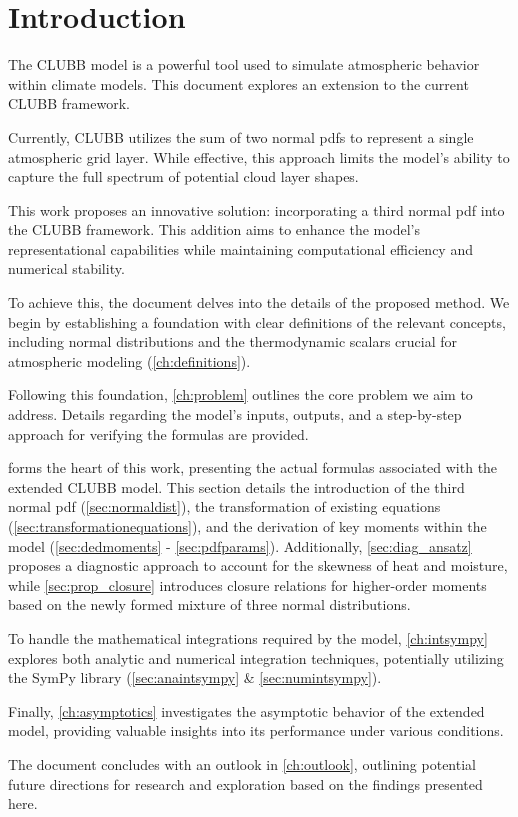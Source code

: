\chapter{Introduction}\label{ch:introduction}

The \gls{CLUBB} model is a powerful tool used to simulate atmospheric behavior within climate models.
This document explores an extension to the current \gls{CLUBB} framework.

Currently, \gls{CLUBB} utilizes the sum of two normal \glspl{pdf} to represent a single atmospheric grid layer.
While effective, this approach limits the model's ability to capture the full spectrum of potential cloud layer shapes.

This work proposes an innovative solution: incorporating a third normal \gls{pdf} into the \gls{CLUBB} framework.
This addition aims to enhance the model's representational capabilities while maintaining computational efficiency and numerical stability.

To achieve this, the document delves into the details of the proposed method.
We begin by establishing a foundation with clear definitions of the relevant concepts, including normal distributions and the thermodynamic scalars crucial for atmospheric modeling (\cref{ch:definitions}).

Following this foundation, \cref{ch:problem} outlines the core problem we aim to address.
Details regarding the model's inputs, outputs, and a step-by-step approach for verifying the formulas are provided.

 forms the heart of this work, presenting the actual formulas associated with the extended CLUBB model.
This section details the introduction of the third normal \gls{pdf} (\cref{sec:normaldist}), the transformation of existing equations (\cref{sec:transformationequations}), and the derivation of key moments within the model (\cref{sec:dedmoments} - \cref{sec:pdfparams}).
Additionally, \cref{sec:diag_ansatz} proposes a diagnostic approach to account for the skewness of heat and moisture, while \cref{sec:prop_closure} introduces closure relations for higher-order moments based on the newly formed mixture of three normal distributions.

To handle the mathematical integrations required by the model, \cref{ch:intsympy} explores both analytic and numerical integration techniques, potentially utilizing the SymPy library (\cref{sec:anaintsympy} \& \cref{sec:numintsympy}).

Finally, \cref{ch:asymptotics} investigates the asymptotic behavior of the extended model, providing valuable insights into its performance under various conditions.

The document concludes with an outlook in \cref{ch:outlook}, outlining potential future directions for research and exploration based on the findings presented here.
